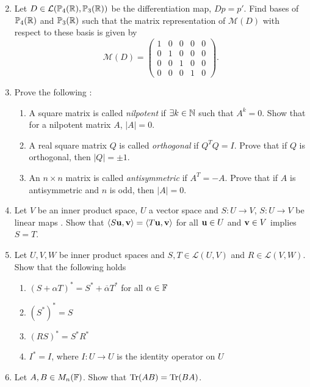 \documentclass{article}
\begin{document}
\begin{enumerate}
\begin{equation*}
\end{equation*}
    \item Let $D \in \mathcal{L}(\mathbb{P}_4({\mathbb{R}}),\mathbb{P}_3({\mathbb{R}}))$ be the differentiation map, $Dp = p'$. Find bases of $\mathbb{P}_4({\mathbb{R}})$ and $\mathbb{P}_3({\mathbb{R}})$ such that the matrix representation of $\mathcal{M}(D)$ with respect to these basis is given by 
    \begin{equation*}
    \mathcal{M}(D) = \begin{pmatrix}
    1 & 0 & 0 & 0 & 0 \\
    0 & 1 & 0 & 0 & 0 \\
    0 & 0 & 1 & 0 & 0 \\
    0 & 0 & 0 & 1 & 0
     \end{pmatrix}.
    \end{equation*}
     \item Prove the following \cite[p.85]{linalgwrong}:
\begin{enumerate}
    \item A square matrix is called \emph{nilpotent} if $\exists k \in {\mathbb{N}}$ such that $A^k = 0$. Show that for a nilpotent matrix $A$, $|A| = 0$.
    \item A real square matrix $Q$ is called \emph{orthogonal} if $Q^T Q = I$. Prove that if $Q$ is orthogonal, then $|Q| = \pm 1$.
    \item An $n \times n$ matrix is called \emph{antisymmetric} if $A^T = -A$. Prove that if $A$ is antisymmetric and $n$ is odd, then $|A|=0$. 
\end{enumerate}
         \item Let $V$ be an inner product space, $U$ a vector space and $S\colon U \to V$, $S\colon U \to V$ be linear maps . Show that $\langle S{\mathbf{u}},{\mathbf{v}} \rangle= \langle T{\mathbf{u}}, {\mathbf{v}} \rangle$ for all ${\mathbf{u}} \in U$ and ${\mathbf{v}} \in V$ implies $S=T$.
    \item Let $U,V,W$ be inner product spaces and $S,T \in \mathcal{L}(U,V)$ and $R\in \mathcal{L}(V,W)$. Show that the following holds
\begin{enumerate}
    \item $(S+\alpha T)^* = S^* + \overline{\alpha}T^*$ for all $\alpha\in {\mathbb{F}}$
    \item $(S^*)^* = S$
    \item $(RS)^* = S^*R^*$
    \item $I^* = I$, where $I \colon U \to U$ is the identity operator on $U$
\end{enumerate}
    \item Let $A,B \in M_n({\mathbb{F}})$. Show that $\mathrm{Tr}(AB) = \mathrm{Tr}(BA)$.

\end{enumerate}
\end{document}
